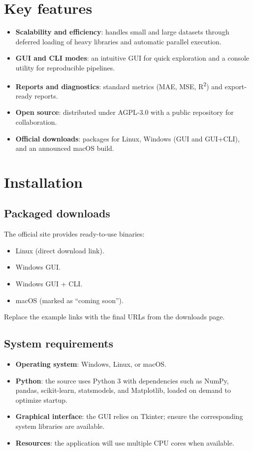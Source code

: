 \documentclass[11pt,a4paper]{article}
\begin{document}
\section{Key features}
\begin{itemize}[leftmargin=1.2cm]
  \item \textbf{Scalability and efficiency}: handles small and large datasets through deferred loading of heavy libraries and automatic parallel execution.\cite{mlrx-index}
  \item \textbf{GUI and CLI modes}: an intuitive GUI for quick exploration and a console utility for reproducible pipelines.\cite{mlrx-index}
  \item \textbf{Reports and diagnostics}: standard metrics (MAE, MSE, R\textsuperscript{2}) and export-ready reports.\cite{mlrx-index}
  \item \textbf{Open source}: distributed under AGPL-3.0 with a public repository for collaboration.\cite{mlrx-index}
  \item \textbf{Official downloads}: packages for Linux, Windows (GUI and GUI+CLI), and an announced macOS build.\cite{mlrx-index}
\end{itemize}

\section{Installation}
\subsection{Packaged downloads}
The official site provides ready-to-use binaries:
\begin{itemize}
  \item Linux (direct download link).
  \item Windows GUI.
  \item Windows GUI + CLI.
  \item macOS (marked as ``coming soon'').
\end{itemize}
Replace the example links with the final URLs from the downloads page.\cite{mlrx-index}

\subsection{System requirements}
\begin{itemize}
  \item \textbf{Operating system}: Windows, Linux, or macOS.
  \item \textbf{Python}: the source uses Python 3 with dependencies such as NumPy, pandas, scikit-learn, statsmodels, and Matplotlib, loaded on demand to optimize startup.\cite{mlrx-source-imports}
  \item \textbf{Graphical interface}: the GUI relies on Tkinter; ensure the corresponding system libraries are available.
  \item \textbf{Resources}: the application will use multiple CPU cores when available.
\end{itemize}
\end{document}
